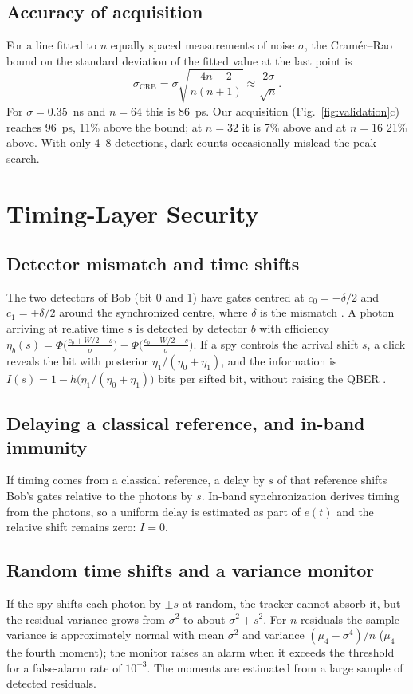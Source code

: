 \documentclass[journal]{IEEEtran}
\theoremstyle{plain}
\begin{document}
\subsection{Accuracy of acquisition}
For a line fitted to $n$ equally spaced measurements of noise $\sigma$, the Cram\'er--Rao bound \cite{kay1993} on the standard deviation of the fitted value at the last point is
\begin{equation}
\sigma_{\mathrm{CRB}}=\sigma\sqrt{\frac{4n-2}{n(n+1)}}\approx\frac{2\sigma}{\sqrt n}.
\end{equation}
For $\sigma=0.35$~ns and $n=64$ this is 86~ps. Our acquisition (Fig.~\ref{fig:validation}c) reaches 96~ps, 11\% above the bound; at $n=32$ it is 7\% above and at $n=16$ 21\% above. With only 4--8 detections, dark counts occasionally mislead the peak search.

\section{Timing-Layer Security}
\label{sec:security}
\subsection{Detector mismatch and time shifts}
The two detectors of Bob (bit 0 and 1) have gates centred at $c_0=-\delta/2$ and $c_1=+\delta/2$ around the synchronized centre, where $\delta$ is the mismatch \cite{makarov2006}. A photon arriving at relative time $s$ is detected by detector $b$ with efficiency $\eta_b(s)=\Phi\!\big(\tfrac{c_b+W/2-s}{\sigma}\big)-\Phi\!\big(\tfrac{c_b-W/2-s}{\sigma}\big)$. If a spy controls the arrival shift $s$, a click reveals the bit with posterior $\eta_1/(\eta_0+\eta_1)$, and the information is $I(s)=1-h\big(\eta_1/(\eta_0+\eta_1)\big)$ bits per sifted bit, without raising the QBER \cite{qi2007,zhao2008}.

\subsection{Delaying a classical reference, and in-band immunity}
If timing comes from a classical reference, a delay by $s$ of that reference shifts Bob's gates relative to the photons by $s$. In-band synchronization derives timing from the photons, so a uniform delay is estimated as part of $e(t)$ and the relative shift remains zero: $I=0$.

\subsection{Random time shifts and a variance monitor}
If the spy shifts each photon by $\pm s$ at random, the tracker cannot absorb it, but the residual variance grows from $\sigma^2$ to about $\sigma^2+s^2$. For $n$ residuals the sample variance is approximately normal with mean $\sigma^2$ and variance $(\mu_4-\sigma^4)/n$ ($\mu_4$ the fourth moment); the monitor raises an alarm when it exceeds the threshold for a false-alarm rate of $10^{-3}$. The moments are estimated from a large sample of detected residuals.
\end{document}
